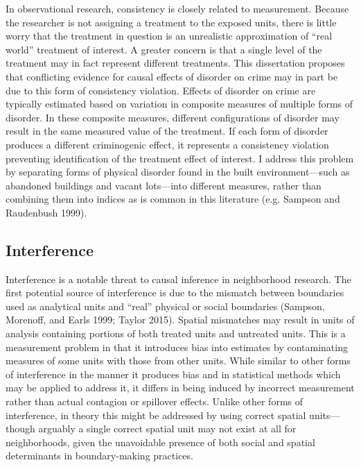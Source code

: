 \documentclass [11pt, proquest] {uwthesis}[2015/03/03]
\begin{document}
In observational research, consistency is closely related to measurement. Because the researcher is not assigning a treatment to the exposed units, there is little worry that the treatment in question is an unrealistic approximation of ``real world'' treatment of interest. A greater concern is that a single level of the treatment may in fact represent different treatments. This dissertation proposes that conflicting evidence for causal effects of disorder on crime may in part be due to this form of consistency violation. Effects of disorder on crime are typically estimated based on variation in composite measures of multiple forms of disorder. In these composite measures, different configurations of disorder may result in the same measured value of the treatment. If each form of disorder produces a different criminogenic effect, it represents a consistency violation preventing identification of the treatment effect of interest. I address this problem by separating forms of physical disorder found in the built environment---such as abandoned buildings and vacant lots---into different measures, rather than combining them into indices as is common in this literature (e.g. Sampson and Raudenbush 1999).

\hypertarget{interference}{%
\subsection{Interference}\label{interference}}

Interference is a notable threat to causal inference in neighborhood research. The first potential source of interference is due to the mismatch between boundaries used as analytical units and ``real'' physical or social boundaries (Sampson, Morenoff, and Earls 1999; Taylor 2015). Spatial mismatches may result in units of analysis containing portions of both treated units and untreated units. This is a measurement problem in that it introduces bias into estimates by contaminating measures of some units with those from other units. While similar to other forms of interference in the manner it produces bias and in statistical methods which may be applied to address it, it differs in being induced by incorrect measurement rather than actual contagion or spillover effects. Unlike other forms of interference, in theory this might be addressed by using correct spatial units---though arguably a single correct spatial unit may not exist at all for neighborhoods, given the unavoidable presence of both social and spatial determinants in boundary-making practices.
\end{document}
